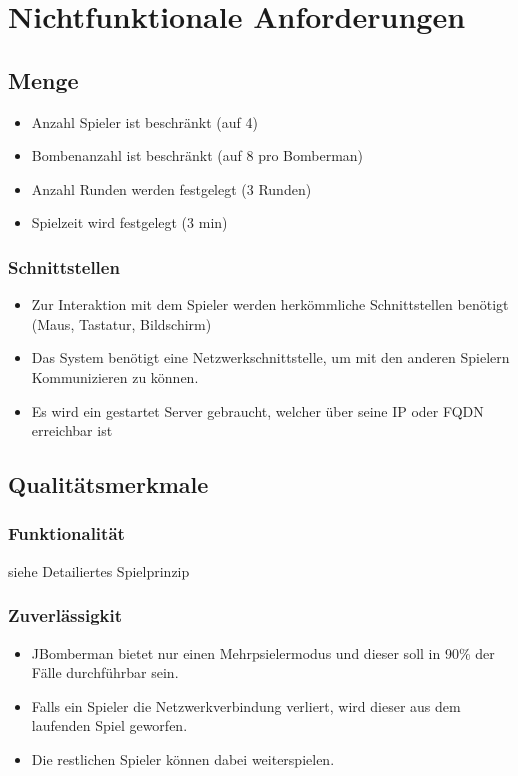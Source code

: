 \documentclass[11pt]{scrartcl}
\begin{document}
\newpage
\section{Nichtfunktionale Anforderungen}
\label{sec:Nicht funktionale Anforderungen}


\subsection{Menge}
\label{sec:Menge}
\begin{itemize}
    \item Anzahl Spieler ist beschränkt (auf 4)
    \item Bombenanzahl ist beschränkt (auf 8 pro Bomberman)
    \item Anzahl Runden werden festgelegt (3 Runden)
    \item Spielzeit wird festgelegt (3 min)
\end{itemize}



\subsubsection{Schnittstellen}
\label{sec:Schnittstellen}
\begin{itemize}
    \item Zur Interaktion mit dem Spieler werden herkömmliche Schnittstellen benötigt 
    (Maus, Tastatur, Bildschirm)
    \item Das System benötigt eine Netzwerkschnittstelle, um mit den 
    anderen Spielern Kommunizieren zu können.
    \item Es wird ein gestartet Server gebraucht, welcher über seine IP oder FQDN
     erreichbar ist
\end{itemize}

\subsection{Qualitätsmerkmale}
\label{sec:Qualitätsmermale}

\subsubsection{Funktionalität}
\label{sec:Funktionalität}
siehe Detailiertes Spielprinzip


\subsubsection{Zuverlässigkit}
\label{sec:Zuverlässigkeit}
\begin{itemize}
    \item JBomberman bietet nur einen Mehrpsielermodus und
     dieser soll in 90\% der Fälle durchführbar sein.
    \item Falls ein Spieler die Netzwerkverbindung verliert, wird 
    dieser aus dem laufenden Spiel geworfen.
    \item Die restlichen Spieler können dabei weiterspielen.
\end{itemize}
\end{document}
